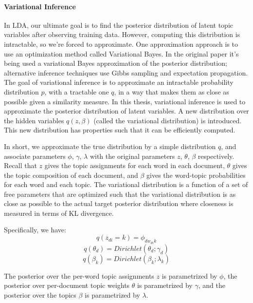 \documentclass[12pt]{report}
\begin{document}
\paragraph{Variational Inference}

In LDA, our ultimate goal is to find the posterior distribution of latent topic 
variables after observing training data. However, computing this distribution 
is intractable, so we’re forced to approximate. One approximation approach is to 
use an optimization method called Variational Bayes. In the original paper it's 
being used a variational Bayes approximation of the posterior distribution;
\cite{blei2003latent} alternative inference techniques use Gibbs sampling and
expectation propagation. The goal of variational inference is to approximate an
intractable probability distribution $p$, with a tractable one $q$, in a way
that makes them as close as possible given a similarity measure. In this thesis,
variational inference is used to approximate the posterior distribution of
latent variables. A new distribution over the hidden variables $q(z, \beta)$
(called the variational distribution) is  introduced. This new distribution has
properties such that it can be efficiently computed.\cite{Fox2011ATO}

In short, we approximate the true distribution by a simple distribution $q$, and 
associate parameters $\phi$, $\gamma$, $\lambda$ with the original parameters 
$z$, $\theta$, $\beta$ respectively. Recall that $z$ gives the topic assignments 
for each word in each document, $\theta$ gives the topic composition of each 
document, and $\beta$ gives the word-topic probabilities for each word and each 
topic. The variational distribution is a function of a set of free parameters that 
are optimized such that the variational distribution is as close as possible to 
the actual target posterior distribution where closeness is measured in terms of 
KL divergence.

Specifically, we have:
\begin{equation}
q(z_{di}=k) = \phi_{dw_{di}k}
\end{equation}
\begin{equation}
q(\theta_{d}) = Dirichlet(\theta_{d}; \gamma_{d})
\end{equation}
\begin{equation}
q(\beta_{k}) = Dirichlet(\beta_{k}; \lambda_{k})
\end{equation}

The posterior over the per-word topic assignments $z$ is parametrized by
$\phi$, the posterior over per-document topic weights $\theta$ is parametrized
by $\gamma$, and the posterior over the topics $\beta$ is parametrized by
$\lambda$. 
\end{document}

